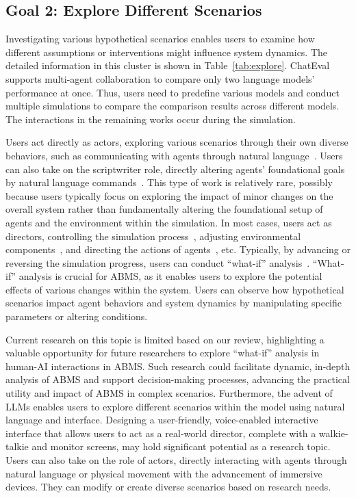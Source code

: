 \subsection{Goal 2: Explore Different Scenarios}
Investigating various hypothetical scenarios enables users to examine how different assumptions or interventions might influence system dynamics.
The detailed information in this cluster is shown in Table~\ref{tab:explore}.
ChatEval~\cite{chan2023chatevalbetterllmbasedevaluators} supports multi-agent collaboration to compare only two language models' performance at once.
Thus, users need to predefine various models and conduct multiple simulations to compare the comparison results across different models.
The interactions in the remaining works occur during the simulation.

Users act directly as actors, exploring various scenarios through their own diverse behaviors, such as communicating with agents through natural language~\cite{10.1145/3586183.3606763,lin2023agentsimsopensourcesandboxlarge}.
Users can also take on the scriptwriter role, directly altering agents' foundational goals by natural language commands~\cite{10.1145/3586183.3606763}.
This type of work is relatively rare, possibly because users typically focus on exploring the impact of minor changes on the overall system rather than fundamentally altering the foundational setup of agents and the environment within the simulation.
In most cases, users act as directors, controlling the simulation process~\cite{wang2023humanoidagentsplatformsimulating, pan2024agentcoordvisuallyexploringcoordination}, adjusting environmental components~\cite{hua2024warpeacewaragentlarge}, and directing the actions of agents~\cite{DBLP:journals/corr/abs-2312-11813,10.1145/3613904.3642545}, etc.
Typically, by advancing or reversing the simulation progress, users can conduct ``what-if'' analysis~\cite{cui2024chatlawmultiagentcollaborativelegal,10.1145/3526113.3545616}.
``What-if'' analysis is crucial for ABMS, as it enables users to explore the potential effects of various changes within the system.
Users can observe how hypothetical scenarios impact agent behaviors and system dynamics by manipulating specific parameters or altering conditions. 

Current research on this topic is limited based on our review, highlighting a valuable opportunity for future researchers to explore ``what-if'' analysis in human-AI interactions in ABMS.
Such research could facilitate dynamic, in-depth analysis of ABMS and support decision-making processes, advancing the practical utility and impact of ABMS in complex scenarios.
Furthermore, the advent of LLMs enables users to explore different scenarios within the model using natural language and interface.
Designing a user-friendly, voice-enabled interactive interface that allows users to act as a real-world director, complete with a walkie-talkie and monitor screens, may hold significant potential as a research topic.
Users can also take on the role of actors, directly interacting with agents through natural language or physical movement with the advancement of immersive devices. 
They can modify or create diverse scenarios based on research needs.

